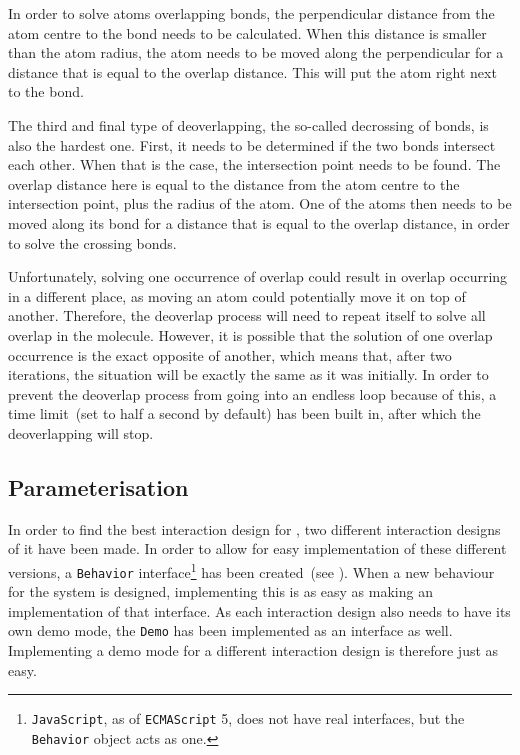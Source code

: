 In order to solve atoms overlapping bonds, the perpendicular distance from the atom centre to the bond needs to be calculated. When this distance is smaller than the atom radius, the atom needs to be moved along the perpendicular for a distance that is equal to the overlap distance. This will put the atom right next to the bond.

The third and final type of deoverlapping, the so-called decrossing of bonds, is also the hardest one. First, it needs to be determined if the two bonds intersect each other. When that is the case, the intersection point needs to be found. The overlap distance here is equal to the distance from the atom centre to the intersection point, plus the radius of the atom. One of the atoms then needs to be moved along its bond for a distance that is equal to the overlap distance, in order to solve the crossing bonds.

Unfortunately, solving one occurrence of overlap could result in overlap occurring in a different place, as moving an atom could potentially move it on top of another. Therefore, the deoverlap process will need to repeat itself to solve all overlap in the molecule. However, it is possible that the solution of one overlap occurrence is the exact opposite of another, which means that, after two iterations, the situation will be exactly the same as it was initially. In order to prevent the deoverlap process from going into an endless loop because of this, a time limit~(set to half a second by default) has been built in, after which the deoverlapping will stop.


\subsection{Parameterisation}
In order to find the best interaction design for \oframp, two different interaction designs of it have been made. In order to allow for easy implementation of these different versions, a \verb|Behavior| interface\footnote{\texttt{JavaScript}, as of \texttt{ECMAScript} 5, does not have real interfaces, but the \texttt{Behavior} object acts as one.} has been created~(see ). When a new behaviour for the system is designed, implementing this is as easy as making an implementation of that interface. As each interaction design also needs to have its own demo mode, the \verb|Demo| has been implemented as an interface as well. Implementing a demo mode for a different interaction design is therefore just as easy.


